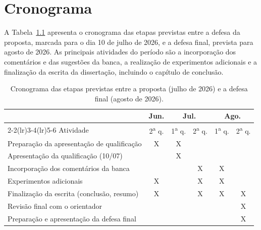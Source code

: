 \chapter{Cronograma}
\label{cap:cronograma}

A Tabela~\ref{tab:cronograma} apresenta o cronograma das etapas previstas entre a defesa da proposta, marcada para o dia 10 de julho de 2026, e a defesa final, prevista para agosto de 2026. As principais atividades do período são a incorporação dos comentários e das sugestões da banca, a realização de experimentos adicionais e a finalização da escrita da dissertação, incluindo o capítulo de conclusão.

\begin{table}[h!]
\centering
\caption{Cronograma das etapas previstas entre a proposta (julho de 2026) e a defesa final (agosto de 2026).}
\label{tab:cronograma}
\begin{tabular}{lccccc}
\toprule
 & Jun. & \multicolumn{2}{c}{Jul.} & \multicolumn{2}{c}{Ago.} \\
\cmidrule(lr){2-2}\cmidrule(lr){3-4}\cmidrule(lr){5-6}
Atividade & 2\textsuperscript{a} q. & 1\textsuperscript{a} q. & 2\textsuperscript{a} q. & 1\textsuperscript{a} q. & 2\textsuperscript{a} q. \\
\midrule
Preparação da apresentação de qualificação        & X & X &   &   &   \\
Apresentação da qualificação (10/07)               &   & X &   &   &   \\
Incorporação dos comentários da banca              &   &   & X & X &   \\
Experimentos adicionais                            & X &   & X & X &   \\
Finalização da escrita (conclusão, resumo)         & X &   & X & X & X \\
Revisão final com o orientador                     &   &   &   &   & X \\
Preparação e apresentação da defesa final          &   &   &   &   & X \\
\bottomrule
\end{tabular}
\end{table}
